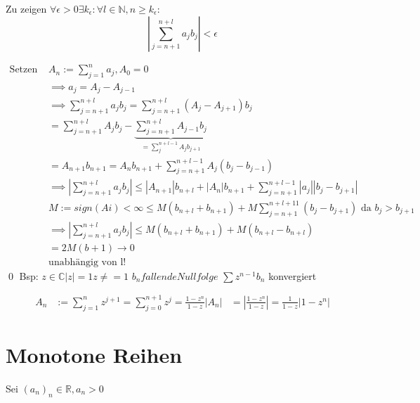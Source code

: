 \documentclass[fleqn]{scrbook}
\renewenvironment{proof}{{\bfseries Beweis }}{\qed}
\begin{document}
\begin{proof}
 Zu zeigen $\forall \epsilon > 0 \exists k_\epsilon: \forall l \in \mathbb{N}, n \ge k_\epsilon:$
 $$| \sum_{j=n+1}^{n+l} a_j b_j | < \epsilon$$
 
 \begin{equation}
  \begin{split}
    \text{Setzen } & A_n := \sum_{j=1}^{n}a_j, A_0 = 0 \\
    & \implies a_j = A_j - A_{j-1} \\
    & \implies \sum_{j=n+1}^{n+l}  a_j b_j = \sum_{j=n+1}^{n+l} (A_j - A_{j+1}) b_j \\
    & = \sum_{j=n+1}^{n+l}  A_j b_j - \underbrace{\sum_{j=n+1}^{n+l}  A_{j-1} b_j}_{= \sum_j^{n+l-1} A_j b_{j+1}} \\
    & = A_{n+1} b_{n+1} = A_n b_{n+1} + \sum_{j=n+1}^{n+l-1} A_j (b_j - b_{j-1}) \\
    & \implies | \sum_{j=n+1}^{n+l}  a_j b_j | \le | A_{n+1} | b_{n+l} + |A_n| b_{n+1} + \sum_{j=n+1}^{n+l-1} |a_j| |b_j - b_{j+1}|  \\
    & M := sign(Ai) < \infty \le M (b_{n+l} + b_{n+1}) + M \sum_{j=n+1}^{n+l+11} (b_j - b_{j+1})  \text{  da  } b_j > b_{j+1} \\
    & \implies |\sum_{j=n+1}^{n+l} a_j b_j| \le M(b_{n+l} + b_{n+1}) + M (b_{n+l} - b_{n+l}) \\
    & = 2 M(b+1) \to 0 \\
    & \text{unabhängig von l!}
  \end{split}
 \end{equation}
\end{proof}
Bsp: $z \in \mathbb{C} |z| = 1 z \neq = 1$
$b_n fallende Nullfolge$
$\sum z^{n-1} b_n$ konvergiert

\begin{equation}
 \begin{split}
  A_n & := \sum_{j=1}^{n} z^{j+1} = \sum_{j=0}^{n+1}z^j = \frac{1-z^n}{1-z}
  |A_n| & = |\frac{1-z^n}{1-z}| = \frac{1}{1-z} | 1-z^n|
 \end{split}
\end{equation}

\section{Monotone Reihen}
Sei $(a_n)_n \in \mathbb{R}, a_n > 0$
\end{document}
